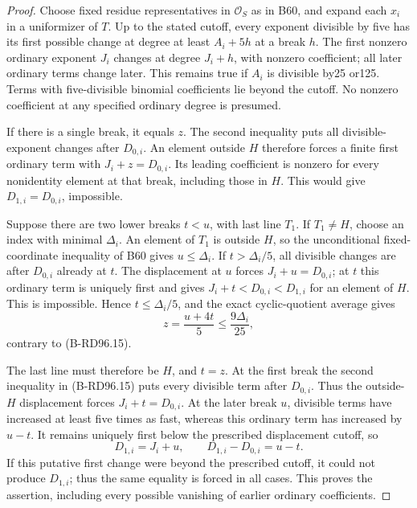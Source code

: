 \begin{proof}
Choose fixed residue representatives in $\mathcal O_S$ as in
B60, and expand each $x_i$ in a uniformizer of $T$. Up to the
stated cutoff, every exponent divisible by five has its first
possible change at degree at least $A_i+5h$ at a break $h$.
The first nonzero ordinary exponent $J_i$ changes at degree
$J_i+h$, with nonzero coefficient; all later ordinary terms
change later. This remains true if $A_i$ is divisible by25 or125.
Terms with five-divisible binomial coefficients lie beyond the
cutoff. No nonzero coefficient at any specified ordinary degree
is presumed.

If there is a single break, it equals $z$. The second inequality
puts all divisible-exponent changes after $D_{0,i}$. An element
outside $H$ therefore forces a finite first ordinary term with
$J_i+z=D_{0,i}$. Its leading coefficient is nonzero for every
nonidentity element at that break, including those in $H$.
This would give $D_{1,i}=D_{0,i}$, impossible.

Suppose there are two lower breaks $t<u$, with last line $T_1$.
If $T_1\ne H$, choose an index with minimal $\Delta_i$.
An element of $T_1$ is outside $H$, so the unconditional
fixed-coordinate inequality of B60 gives $u\le\Delta_i$.
If $t>\Delta_i/5$, all divisible changes are after $D_{0,i}$
already at $t$. The displacement at $u$ forces
$J_i+u=D_{0,i}$; at $t$ this ordinary term is uniquely first
and gives $J_i+t<D_{0,i}<D_{1,i}$ for an element of $H$.
This is impossible. Hence $t\le\Delta_i/5$, and the exact
cyclic-quotient average gives
\[
 z=\frac{u+4t}{5}\le\frac{9\Delta_i}{25},
                                                        \tag{B-RD96.16}
\]
contrary to (B-RD96.15).

The last line must therefore be $H$, and $t=z$. At the first
break the second inequality in (B-RD96.15) puts every divisible
term after $D_{0,i}$. Thus the outside-$H$ displacement forces
$J_i+t=D_{0,i}$. At the later break $u$, divisible terms have
increased at least five times as fast, whereas this ordinary
term has increased by $u-t$. It remains uniquely first below
the prescribed displacement cutoff, so
\[
 D_{1,i}=J_i+u,
 \qquad D_{1,i}-D_{0,i}=u-t.
                                                        \tag{B-RD96.17}
\]
If this putative first change were beyond the prescribed cutoff,
it could not produce $D_{1,i}$; thus the same equality is forced
in all cases. This proves the assertion, including every possible
vanishing of earlier ordinary coefficients.
\end{proof}

